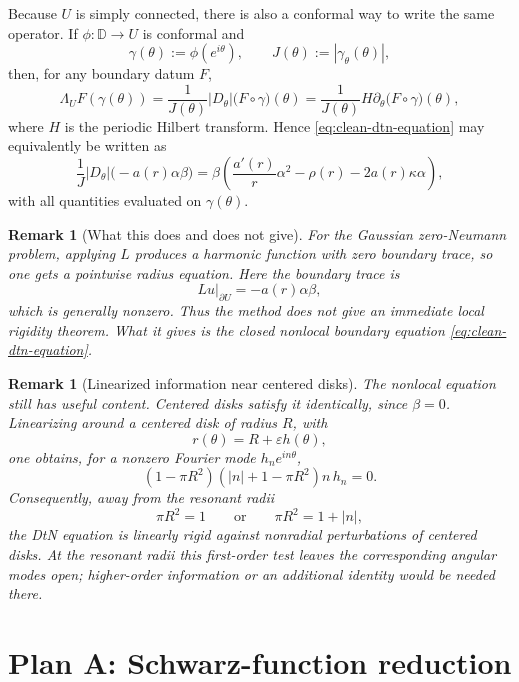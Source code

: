 \documentclass[11pt]{article}
\newtheorem{remark}[theorem]{Remark}
\newcommand{\1}{\mathbf 1}
\begin{document}
Because \(U\) is simply connected, there is also a conformal way to write the same
operator.  If \(\phi:\mathbb D\to U\) is conformal and
\[
  \gamma(\theta):=\phi(e^{i\theta}),
  \qquad
  J(\theta):=|\gamma_\theta(\theta)|,
\]
then, for any boundary datum \(F\),
\begin{equation}\label{eq:conformal-dtn}
  \Lambda_U F(\gamma(\theta))
  =
  \frac{1}{J(\theta)}
  |D_\theta|\bigl(F\circ\gamma\bigr)(\theta)
  =
  \frac{1}{J(\theta)}
  H\partial_\theta\bigl(F\circ\gamma\bigr)(\theta),
\end{equation}
where \(H\) is the periodic Hilbert transform.  Hence
\eqref{eq:clean-dtn-equation} may equivalently be written as
\begin{equation}\label{eq:conformal-clean-dtn}
  \frac{1}{J}|D_\theta|\bigl(-a(r)\alpha\beta\bigr)
  =
  \beta\left(
  \frac{a'(r)}{r}\alpha^2-\rho(r)-2a(r)\kappa\alpha
  \right),
\end{equation}
with all quantities evaluated on \(\gamma(\theta)\).

\begin{remark}[What this does and does not give]
For the Gaussian zero-Neumann problem, applying \(L\) produces a harmonic function
with zero boundary trace, so one gets a pointwise radius equation.  Here the boundary
trace is
\[
  Lu|_{\partial U}=-a(r)\alpha\beta,
\]
which is generally nonzero.  Thus the method does not give an immediate local
rigidity theorem.  What it gives is the closed nonlocal boundary equation
\eqref{eq:clean-dtn-equation}.
\end{remark}

\begin{remark}[Linearized information near centered disks]
The nonlocal equation still has useful content.  Centered disks satisfy it
identically, since \(\beta=0\).  Linearizing around a centered disk of radius \(R\),
with
\[
  r(\theta)=R+\varepsilon h(\theta),
\]
one obtains, for a nonzero Fourier mode \(h_n e^{in\theta}\),
\[
  (1-\pi R^2)(|n|+1-\pi R^2)n\,h_n=0.
\]
Consequently, away from the resonant radii
\[
  \pi R^2=1
  \qquad\text{or}\qquad
  \pi R^2=1+|n|,
\]
the DtN equation is linearly rigid against nonradial perturbations of centered
disks.  At the resonant radii this first-order test leaves the corresponding angular
modes open; higher-order information or an additional identity would be needed there.
\end{remark}

\section{Plan A: Schwarz-function reduction}
\end{document}

